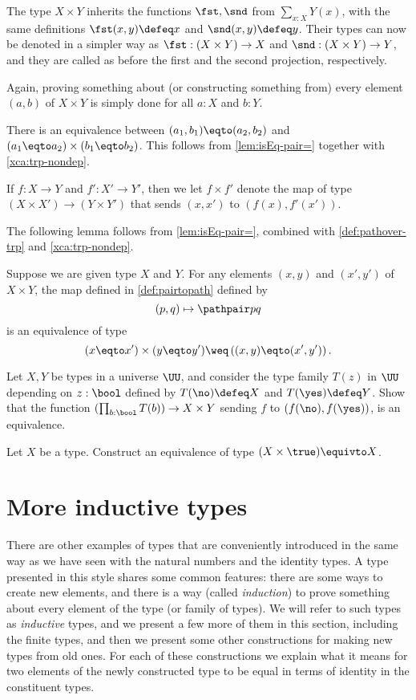 The type $X \times Y$ inherits the functions $\fst,\snd$ from
$\sum_{x:X} Y(x)$, with the same definitions $\fst(x,y)\defeq x$
and $\snd(x,y)\defeq y$. Their types can now be denoted in a
simpler way as $\fst: (X \times Y)\to X$ and
$\snd: (X \times Y)\to Y$, and they are called as before the
first and the second projection, respectively.

Again, proving something about (or constructing something from) every
element $(a,b)$ of $X \times Y$ is simply done for all $a:X$ and $b:Y$.

There is an equivalence between $(a_1,b_1) \eqto (a_2,b_2)$ and $(a_1 \eqto a_2) \times (b_1 \eqto b_2)$.
This follows from \cref{lem:isEq-pair=} together with \cref{xca:trp-nondep}.

If $f: X \to Y$ and $f': X' \to Y'$, then we let
$f\times f'$ denote the map of type $(X\times X') \to (Y\times Y')$
that sends $(x,x')$ to $(f(x),f'(x'))$.

The following lemma follows from \cref{lem:isEq-pair=}, combined with \cref{def:pathover-trp} and \cref{xca:trp-nondep}.

\begin{lemma}\label{lem:isEq-pair-bin=}
  Suppose we are given type $X$ and $Y$.
  For any elements $(x,y)$ and $(x',y')$ of $X \times Y$,
  the map defined in \cref{def:pairtopath} defined by
  \[
    (p,q) \mapsto \pathpair p q
  \]
  is an equivalence of type
  \[
    ( x \eqto x' ) \times (y \eqto y') \weq \left( (x,y) \eqto (x',y') \right).
  \]
\end{lemma}

\begin{xca}\label{xca:binary-prod-equiv}
  Let $X,Y$ be types in a universe $\UU$, and consider the type family
  $T(z)$ in $\UU$ depending on $z:\bool$ defined by
  $T(\no)\defeq X$ and $T(\yes) \defeq Y$.
  Show that the function $(\prod_{b:\bool}T(b))\to X\times Y$
  sending $f$ to $(f(\no),f(\yes))$, is an equivalence.
\end{xca}

\begin{xca}
  Let $X$ be a type.  Construct an equivalence of type $( X \times \true ) \equivto X$.
\end{xca}

\section{More inductive types}
\label{sec:inductive-types}

There are other examples of types that are conveniently introduced
in the same way as we have seen with the natural numbers and the identity types.
A type
presented in this style shares some common features: there are some ways to create new elements, and there is a way (called \emph{induction}) to
prove something about every element of the type (or family of types).  We will refer to such types as \emph{inductive} types, and we present a
few more of them in this section, including the finite types, and then we present some other constructions for making new types from old ones.
For each of these constructions we explain what it means for two elements of the newly constructed type to be equal in terms of identity in the
constituent types.

